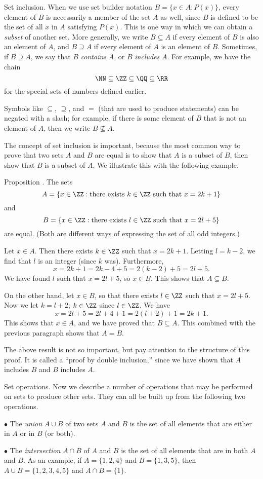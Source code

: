 \medskip\boldlabel Set inclusion.
When we use set builder notation $B = \bigl\{x\in A : P(x)\bigr\}$, every element of $B$ is necessarily
a member of the set $A$ as well, since $B$ is defined to be the set of all $x$ in $A$ satisfying
$P(x)$. This is one way in which we can obtain
a {\it subset} of another set. More generally, we write $B\subseteq A$ if every element of $B$ is also
an element of $A$, and $B\supseteq A$ if every element of $A$ is an element of $B$. Sometimes, if $B\supseteq A$,
we say that $B$ {\it contains} $A$, or $B$ {\it includes} $A$. For example, we have the chain
$$\NN\subseteq \ZZ \subseteq \QQ\subseteq \RR$$
for the special sets of numbers defined earlier.

Symbols like $\subseteq$, $\supseteq$, and $=$ (that are
used to produce statements) can be
negated with a slash; for example, if there is some element of $B$ that is not an element of $A$,
then we write $B\not\subseteq A$.

The concept of set inclusion is important, because
the most common way to prove that two sets $A$ and $B$ are equal is to show that $A$ is a subset of $B$,
then show that $B$ is a subset of $A$. We illustrate this with the following example.

\proclaim Proposition \advthm. The sets
$$A = \{ x\in \ZZ : \hbox{there exists}\ k\in \ZZ\ \hbox{such that}\ x = 2k + 1\}$$
and
$$B = \{ x\in \ZZ : \hbox{there exists}\ l\in \ZZ\ \hbox{such that}\ x = 2l + 5\}$$
are equal. (Both are different ways of expressing the set of all odd integers.)

\proof Let $x\in A$. Then there exists $k\in\ZZ$ such that $x = 2k+1$. Letting $l = k-2$, we find that
$l$ is an integer (since $k$ was). Furthermore,
$$x = 2k+1 = 2k - 4 + 5 = 2(k-2)+5 = 2l+5.$$
We have found $l$ such that $x = 2l+5$, so $x\in B$. This shows that $A\subseteq B$.

On the other hand, let $x\in B$, so that there exists $l\in \ZZ$ such that $x = 2l+5$. Now we let $k = l+2$;
$k\in \ZZ$ since $l\in \ZZ$. We have
$$x = 2l+5 = 2l + 4 + 1 = 2(l+2) + 1 = 2k+1.$$
This shows that $x\in A$, and we have proved that $B\subseteq A$. This combined with the previous paragraph
shows that $A = B$.\slug

The above result is not so important, but pay attention to the structure of this proof. It is called a ``proof
by double inclusion,'' since we have shown that $A$ includes $B$ and $B$ includes $A$.

\medskip\boldlabel Set operations.
Now we describe a number of operations that may be performed on sets to produce other sets. They can all be
built up from the following two operations.
\medskip
\item{$\bullet$} The {\it union} $A\cup B$ of two sets $A$ and $B$ is the set of all elements that are either in
$A$ or in $B$ (or both).
\smallskip
\item{$\bullet$} The {\it intersection} $A\cap B$ of $A$ and $B$ is the set of all elements that are in both $A$
and $B$.
\medskip
As an example, if $A = \{1,2,4\}$ and $B = \{1,3,5\}$, then $A\cup B = \{1,2,3,4,5\}$ and $A\cap B = \{1\}$.

